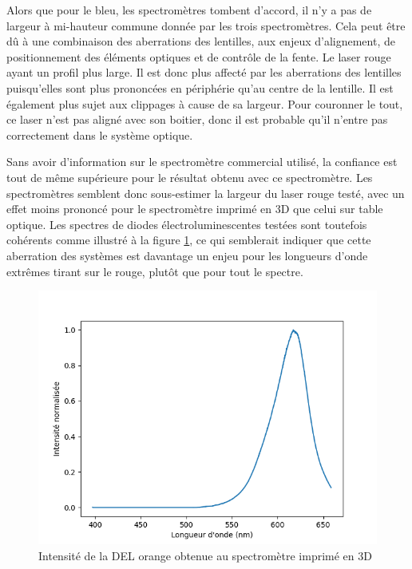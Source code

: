 \documentclass[11pt,letterpaper]{article}
\begin{document}
Alors que pour le bleu, les spectromètres tombent d'accord, il n'y a pas de largeur à mi-hauteur
commune donnée par les trois spectromètres. Cela peut être dû à une combinaison des aberrations 
des lentilles, aux enjeux d'alignement, de positionnement des éléments optiques et de contrôle de
la fente. Le laser rouge ayant un profil plus large. Il est donc plus affecté par les aberrations des lentilles puisqu'elles sont plus prononcées en périphérie qu'au centre de la lentille. Il est également plus sujet aux clippages à cause de sa largeur. Pour couronner le tout,
ce laser n'est pas aligné avec son boitier, donc il est probable qu'il n'entre pas correctement dans
le système optique. 

Sans avoir d'information sur le spectromètre commercial utilisé, la confiance est tout de même supérieure
pour le résultat obtenu avec ce spectromètre. Les spectromètres semblent donc sous-estimer la largeur du
laser rouge testé, avec un effet moins prononcé pour le spectromètre imprimé en 3D que celui sur table optique.
Les spectres de diodes électroluminescentes testées sont toutefois cohérents comme illustré à la figure 
\ref{fig:Int-Del-rousse}, ce qui semblerait indiquer que cette aberration des systèmes est davantage un enjeu
pour les longueurs d'onde extrêmes tirant sur le rouge, plutôt que pour tout le spectre. 

\begin{figure}
  \centering
  \includegraphics[width=0.6\linewidth]{mandat2_ledrousse.png}
  \caption{Intensité de la DEL orange obtenue au spectromètre imprimé en 3D}
  \label{fig:Int-Del-rousse}
\end{figure}

\end{document}
